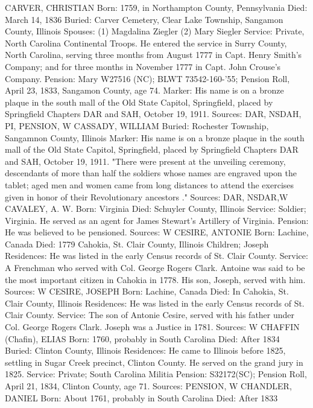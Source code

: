 CARVER, CHRISTIAN 
Born: 1759, in Northampton County, Pennsylvania 
Died: March 14, 1836 
Buried: Carver Cemetery, Clear Lake Township, Sangamon County, Illinois 
Spouses: (1) Magdalina Ziegler (2) Mary Siegler 
Service: 	Private, North Carolina Continental Troops. He entered the service in Surry County, North Carolina, serving three months from August 1777 in Capt. Henry Smith's Company; and for three months in November 1777 in Capt. John Crouse's Company. 
Pension: Mary W27516 (NC); BLWT 73542-160-'55; Pension Roll, April 23, 1833, Sangamon County, age 74. 
Marker: His name is on a bronze plaque in the south mall of the Old State Capitol, Springfield, placed by Springfield Chapters DAR and SAH, October 19, 1911. 
Sources: DAR, NSDAH, PI, PENSION, W 
CASSADY, WILLIAM 
Buried: Rochester Township, Sangamnon County, Illinois 
Marker: His name is on a bronze plaque in the south mall of the Old State Capitol, Springfield, placed by Springfield Chapters DAR and SAH, October 19, 1911. "There were present at the unveiling ceremony, descendants of more than half the soldiers whose names are engraved upon the tablet; aged men and women came from long distances to attend the exercises given in honor of their Revolutionary ancestors ." 
Sources: DAR, NSDAR,W 
CAVALEY, A. W. 
Born: Virginia 
Died: Schuyler County, Illinois 
Service: Soldier; Virginia. He served as an agent for James Stewart's Artillery of Virginia. 
Pension: He was believed to be pensioned. 
Sources: W 
CESIRE, ANTONIE 
Born: Lachine, Canada
Died: 1779 Cahokia, St. Clair County, Illinois Children; Joseph 
Residences: He was listed in the early Census records of St. Clair County. 
Service: A Frenchman who served with Col. George Rogers Clark. Antoine was said to be the most important citizen in Cahokia in 1778. His son, Joseph, served with him. 
Sources: W 
CESIRE, JOSEPH 
Born: Lachine, Canada 
Died: In Cahokia, St. Clair County, Illinois 
Residences: He was listed in the early Census records of St. Clair County. 
Service: The son of Antonie Cesire, served with his father under Col. George Rogers Clark. Joseph was a Justice in 1781. 
Sources: W 
CHAFFIN (Chafin), ELIAS 
Born: 1760, probably in South Carolina 
Died: After 1834 
Buried: Clinton County, Illinois 
Residences: He came to Illinois before 1825, settling in Sugar Creek precinct, Clinton County. He served on the grand jury in 1825. 
Service: Private; South Carolina Militia 
Pension: S32172(SC); Pension Roll, April 21, 1834, Clinton County, age 71. 
Sources: PENSION, W 
CHANDLER, DANIEL 
Born: About 1761, probably in South Carolina 
Died: After 1833 
